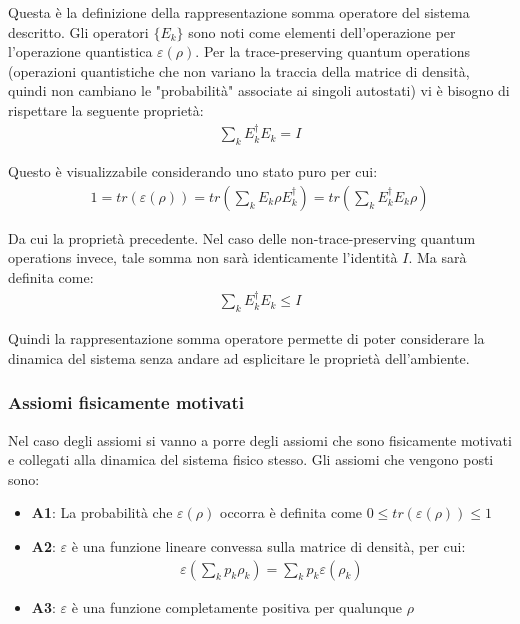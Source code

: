 Questa è la definizione della rappresentazione somma operatore del sistema descritto. Gli operatori \(\{E_k\}\) sono noti come elementi dell'operazione per l'operazione quantistica \(\varepsilon(\rho)\). Per la trace-preserving quantum operations (operazioni quantistiche che non variano la traccia della matrice di densità, quindi non cambiano le "probabilità" associate ai singoli autostati) vi è bisogno di rispettare la seguente proprietà:
\begin{gather*}
    \sum_k E_k^\dagger E_k = I
\end{gather*}

Questo è visualizzabile considerando uno stato puro per cui:
\begin{gather*}
    1 = tr(\varepsilon(\rho)) = tr\left(\sum_k E_k \rho E_k^\dagger\right) = tr\left(\sum_k E_k^\dagger E_k \rho\right)
\end{gather*}

Da cui la proprietà precedente. Nel caso delle non-trace-preserving quantum operations invece, tale somma non sarà identicamente l'identità \(I\). Ma sarà definita come:
\begin{gather*}
    \sum_k E_k^\dagger E_k \le I
\end{gather*}

Quindi la rappresentazione somma operatore permette di poter considerare la dinamica del sistema senza andare ad esplicitare le proprietà dell'ambiente.

\subsubsection{Assiomi fisicamente motivati}
Nel caso degli assiomi si vanno a porre degli assiomi che sono fisicamente motivati e collegati alla dinamica del sistema fisico stesso. Gli assiomi che vengono posti sono:
\begin{itemize}
    \item \textbf{A1}: La probabilità che \(\varepsilon(\rho)\) occorra è definita come \(0 \le tr(\varepsilon(\rho)) \le 1 \)
    
    \item \textbf{A2}: \(\varepsilon\) è una funzione lineare convessa sulla matrice di densità, per cui:
    \begin{gather*}
        \varepsilon\left(\sum_k p_k \rho_k\right) = \sum_k p_k \varepsilon(\rho_k)
    \end{gather*}

    \item \textbf{A3}: \(\varepsilon\) è una funzione completamente positiva per qualunque \(\rho\)
\end{itemize}

